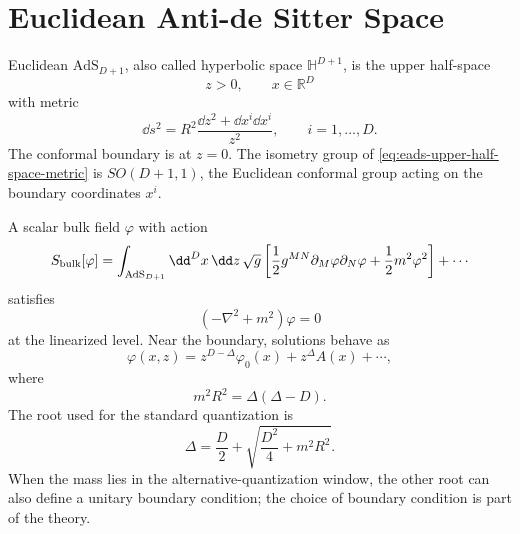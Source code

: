 \section{Euclidean Anti-de Sitter Space}

Euclidean \(\mathrm{AdS}_{D+1}\), also called hyperbolic space
\(\mathbb H^{D+1}\), is the upper half-space
\[
  z>0,\qquad x\in\mathbb R^D
\]
with metric
\begin{equation}
  \dd s^2
  =
  R^2\frac{\dd z^2+\dd x^i\dd x^i}{z^2},
  \qquad i=1,\ldots,D.
  \label{eq:eads-upper-half-space-metric}
\end{equation}
The conformal boundary is at \(z=0\).  The isometry group of
\eqref{eq:eads-upper-half-space-metric} is \(SO(D+1,1)\), the Euclidean
conformal group acting on the boundary coordinates \(x^i\).

A scalar bulk field \(\varphi\) with action
\begin{equation}
  S_{\rm bulk}[\varphi]
  =
  \int_{\mathrm{AdS}_{D+1}}\dd^Dx\,\dd z\,\sqrt g
  \left[
    \frac12g^{MN}\partial_M\varphi\partial_N\varphi
    +\frac12m^2\varphi^2
  \right]
  +\cdots
  \label{eq:eads-scalar-action}
\end{equation}
satisfies
\[
  \left(-\nabla^2+m^2\right)\varphi=0
\]
at the linearized level.  Near the boundary, solutions behave as
\[
  \varphi(x,z)
  =
  z^{D-\Delta}\varphi_0(x)
  +
  z^\Delta A(x)
  +\cdots ,
\]
where
\begin{equation}
  m^2R^2=\Delta(\Delta-D).
  \label{eq:scalar-mass-dimension-relation}
\end{equation}
The root used for the standard quantization is
\[
  \Delta=\frac D2+\sqrt{\frac{D^2}{4}+m^2R^2}.
\]
When the mass lies in the alternative-quantization window, the other root can
also define a unitary boundary condition; the choice of boundary condition is
part of the theory.

